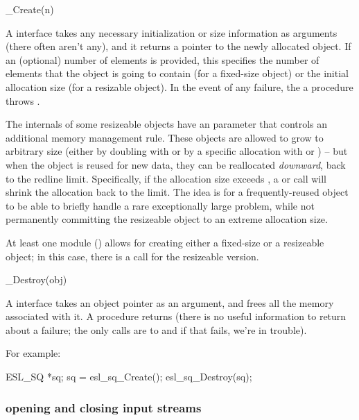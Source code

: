 \begin{sreapi}
\hypertarget{ifc:Create} 
{\item[\_Create(n)]}

A  interface takes any necessary initialization or
size information as arguments (there often aren't any), and it returns a
pointer to the newly allocated object. If an (optional) number of
elements  is provided, this specifies the number of elements
that the object is going to contain (for a fixed-size object) or the
initial allocation size (for a resizable object). In the event of any
failure, the a  procedure throws .

The internals of some resizeable objects have an 
parameter that controls an additional memory management rule. These
objects are allowed to grow to arbitrary size (either by doubling with
 or by a specific allocation with  or
) -- but when the object is reused for new data, they
can be reallocated \emph{downward}, back to the redline
limit. Specifically, if the allocation size exceeds ,
a  or  call will shrink the
allocation back to the  limit.  The idea is for a
frequently-reused object to be able to briefly handle a rare
exceptionally large problem, while not permanently committing the
resizeable object to an extreme allocation size.

At least one module () allows for creating either a
fixed-size or a resizeable object; in this case, there is a
 call for the resizeable version.

\hypertarget{ifc:Destroy} 
{\item[\_Destroy(obj)]}
A  interface takes an object pointer as an
argument, and frees all the memory associated with it. A
 procedure returns  (there is no useful
information to return about a failure; the only calls are to 
 and if that fails, we're in trouble).
\end{sreapi}

For example:
\begin{cchunk}
   ESL_SQ *sq;
   sq = esl_sq_Create();
   esl_sq_Destroy(sq);
\end{cchunk}

  \subsubsection{opening and closing input streams}


